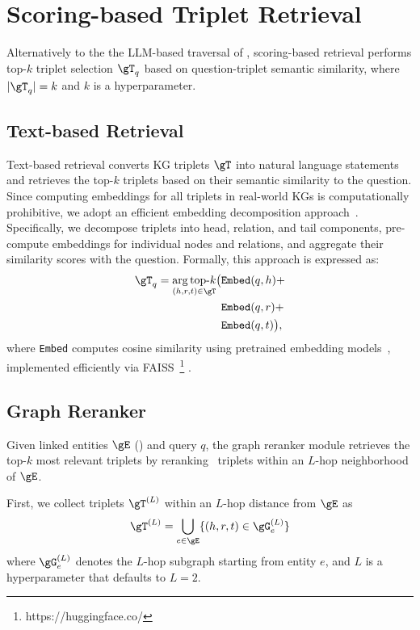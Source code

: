 \appendix




\section{Scoring-based Triplet Retrieval}
\label{app:scoring}

Alternatively to the the LLM-based traversal of , scoring-based retrieval performs top-$k$ triplet selection $\gT_q$ based on question-triplet semantic similarity, where $|\gT_q| = k$ and $k$ is a hyperparameter.


\subsection{Text-based Retrieval}
\label{app:text-retrieval}

Text-based retrieval converts KG triplets $\gT$ into natural language statements and retrieves the top-$k$ triplets based on their semantic similarity to the question. Since computing embeddings for all triplets in real-world KGs is computationally prohibitive, we adopt an efficient embedding decomposition approach~\citep{li2024subgraph}. Specifically, we decompose triplets into head, relation, and tail components, pre-compute embeddings for individual nodes and relations, and aggregate their similarity scores with the question. Formally, this approach is expressed as: \begin{align} 
\gT_q = \underset{(h,r,t) \in \gT}{\arg\text{top-}k}  \big( & \texttt{Embed}(q,h) + \nonumber \\ 
& \texttt{Embed}(q,r) + \nonumber\\ 
& \texttt{Embed}(q,t)\big), 
\label{eq:text-retrieval}
\end{align} 
where \texttt{Embed} computes cosine similarity using pretrained embedding models~\citep{chen2024bge}, implemented efficiently via FAISS~\citep{douze2024faiss}\footnote{https://huggingface.co/} .


\subsection{Graph Reranker}
\label{app:graph-reranker}
Given linked entities $\gE$ () and query $q$, the graph reranker module retrieves the top-$k$ most relevant triplets by reranking~\citep{gao2023retrieval} triplets within an $L$-hop neighborhood of $\gE$.

First, we collect triplets $\gT^{(L)}$ within an $L$-hop distance from $\gE$ as
\begin{equation}
   \gT^{(L)} = \bigcup_{e \in \gE} \{(h,r,t) \in \gG_{e}^{(L)}\}
\end{equation}
where $\gG_{e}^{(L)}$ denotes the $L$-hop subgraph starting from entity $e$, and $L$ is a hyperparameter that defaults to $L=2$.

